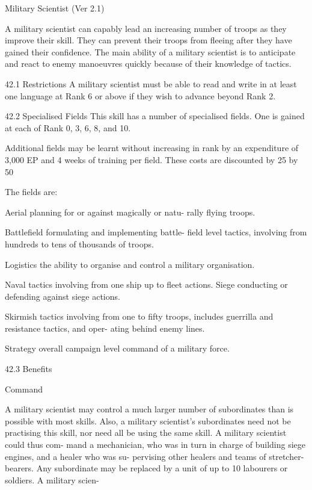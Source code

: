 \begin{Chapter}{Military Scientist (Ver 2.1)}

A military scientist can capably lead an increasing 
number of troops as they improve their skill. They 
can  prevent  their  troops  from  fleeing  after  they 
have gained their confidence. The main ability of a 
military scientist is to anticipate and react to enemy 
manoeuvres quickly because of their knowledge of 
tactics. 

42.1 Restrictions 
A military scientist must be able to read and write 
in at least one language at Rank 6 or above if they 
wish to advance beyond Rank 2. 

42.2 Specialised Fields 
This skill has a number of specialised fields. One is 
gained at each of Rank 0, 3, 6, 8, and 10. 

Additional  fields  may  be  learnt  without  increasing 
in rank by an expenditure of 3,000 EP and 4 weeks 
of training per field. These costs are discounted by 
25%
by 50%

The fields are: 

Aerial  planning  for  or  against  magically  or  natu-
rally flying troops. 

Battlefield  formulating  and  implementing  battle-
field level tactics, involving from hundreds to tens 
of thousands of troops. 

Logistics  the  ability  to  organise  and  control  a 
military organisation. 

Naval  tactics  involving  from  one  ship  up  to  fleet 
actions.  Siege  conducting  or  defending  against 
siege actions.  

Skirmish tactics involving from one to fifty troops, 
includes  guerrilla  and  resistance  tactics,  and  oper-
ating behind enemy lines. 

Strategy  overall  campaign  level  command  of  a 
military force. 

42.3 Benefits 

Command 

A  military  scientist  may  control  a  much  larger 
number of subordinates than is possible  with most 
skills. Also, a military scientist’s subordinates need 
not be practising this skill, nor need all be using the 
same  skill.  A  military  scientist  could  thus  com-
mand a mechanician, who was in turn in charge of 
building  siege  engines,  and  a  healer  who  was  su-
pervising  other  healers  and  teams  of  stretcher-
bearers. Any subordinate may be replaced by a unit 
of up to 10 labourers or soldiers. A military scien-


\end{Chapter}
